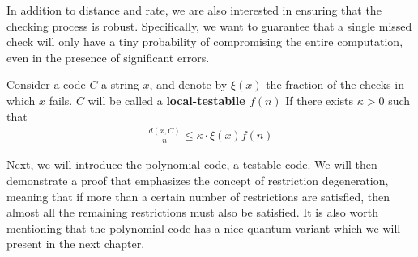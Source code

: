 In addition to distance and rate, we are also interested in ensuring that the checking process is robust. Specifically, we want to guarantee that a single missed check will only have a tiny probability of compromising the entire computation, even in the presence of significant errors. 
\begin{definition} \label{LTC} Consider a code $C$  a string $x$, and denote by $\xi\left( x \right)$ the fraction of the checks in which $x$ fails. $C$ will be called a \textbf{local-testabile $f\left( n \right)$} If there exists $\kappa > 0$ such that 
  \begin{equation*}
    \begin{split}
      \frac{d\left( x, C \right)}{n} \le \kappa \cdot  \xi\left( x \right) f\left( n \right)
    \end{split}
  \end{equation*}
\end{definition}
Next, we will introduce the polynomial code, a testable code. We will then demonstrate a proof that emphasizes the concept of restriction degeneration, meaning that if more than a certain number of restrictions are satisfied, then almost all the remaining restrictions must also be satisfied. It is also worth mentioning that the polynomial code has a nice quantum variant which we will present in the next chapter.

